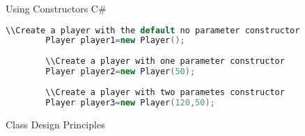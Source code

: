 \begin{frame}[fragile]{Using Constructors C\#}
	\begin{lstlisting}[language=C++,basicstyle=\tiny,]
		\\Create a player with the default no parameter constructor
		Player player1=new Player();
		
		\\Create a player with one parameter constructor
		Player player2=new Player(50);
		
		\\Create a player with two parametes constructor
		Player player3=new Player(120,50);
	\end{lstlisting}
\end{frame}

\begin{frame}{Class Design Principles}
\end{frame}